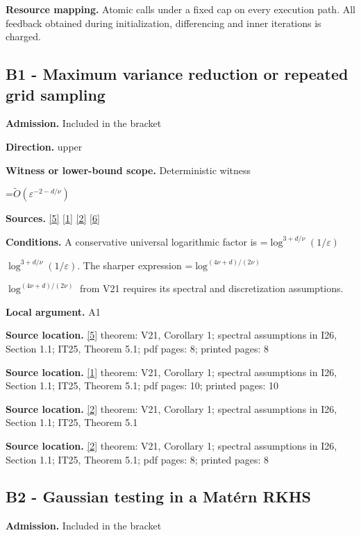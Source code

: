 \documentclass[10pt,a4paper]{article}
\newcommand{\AtlasMath}[1]{\par\begingroup\centering\setbox0=\hbox{$\displaystyle #1$}\ifdim\wd0>1.4\linewidth\typeout{ATLAS WIDE FORMULA: \the\wd0}\fi\ifdim\wd0>\linewidth\resizebox{\linewidth}{!}{\box0}\else\box0\fi\par\endgroup}
\newcommand{\AtlasInlineMath}[1]{\begingroup\setbox0=\hbox{$#1$}\ifdim\wd0>.4\linewidth\endgroup\AtlasMath{#1}\else\endgroup$#1$\fi}
\begin{document}
\textbf{Resource mapping.} Atomic calls under a fixed cap on every execution path. All feedback obtained during initialization, differencing and inner iterations is charged.

\subsection{B1 - Maximum variance reduction or repeated grid sampling}
\textbf{Admission.} Included in the bracket

\textbf{Direction.} upper

\textbf{Witness or lower-bound scope.} Deterministic witness

\AtlasMath{\widetilde{O}(\varepsilon^{-2-d/\nu})}
\textbf{Sources.} \href{https://proceedings.neurips.cc/paper/2021/file/b1300291698eadedb559786c809cc592-Paper.pdf}{[5]} \href{https://arxiv.org/html/2602.17940v1}{[1]} \href{https://arxiv.org/html/2502.06363v1}{[2]} \href{https://arxiv.org/html/2607.29245v2}{[6]}

\textbf{Conditions.} A conservative universal logarithmic factor is \AtlasInlineMath{\log^{3+d/\nu}(1/\varepsilon)}. The sharper expression \AtlasInlineMath{\log^{(4\nu+d)/(2\nu)}} from V21 requires its spectral and discretization assumptions.

\textbf{Local argument.} A1

\textbf{Source location.} \href{https://proceedings.neurips.cc/paper/2021/file/b1300291698eadedb559786c809cc592-Paper.pdf}{[5]} theorem: V21, Corollary 1; spectral assumptions in I26, Section 1.1; IT25, Theorem 5.1; pdf pages: 8; printed pages: 8

\textbf{Source location.} \href{https://arxiv.org/html/2602.17940v1}{[1]} theorem: V21, Corollary 1; spectral assumptions in I26, Section 1.1; IT25, Theorem 5.1; pdf pages: 10; printed pages: 10

\textbf{Source location.} \href{https://arxiv.org/html/2502.06363v1}{[2]} theorem: V21, Corollary 1; spectral assumptions in I26, Section 1.1; IT25, Theorem 5.1

\textbf{Source location.} \href{https://arxiv.org/html/2502.06363v1}{[2]} theorem: V21, Corollary 1; spectral assumptions in I26, Section 1.1; IT25, Theorem 5.1; pdf pages: 8; printed pages: 8

\subsection{B2 - Gaussian testing in a Matérn RKHS}
\textbf{Admission.} Included in the bracket
\end{document}
